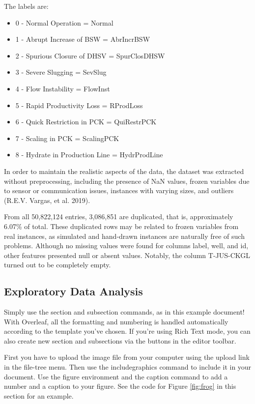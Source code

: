 \documentclass{article}
\begin{document}
The labels are:

\begin{itemize}
\item 0 - Normal Operation = Normal
\item 1 - Abrupt Increase of BSW = AbrIncrBSW
\item 2 - Spurious Closure of DHSV = SpurClosDHSW
\item 3 - Severe Slugging = SevSlug
\item 4 - Flow Instability = FlowInst
\item 5 - Rapid Productivity Loss = RProdLoss
\item 6 - Quick Restriction in PCK = QuiRestrPCK
\item 7 - Scaling in PCK = ScalingPCK
\item 8 - Hydrate in Production Line = HydrProdLine
\end{itemize}

In order to maintain the realistic aspects of the data, the dataset was extracted without preprocessing, including the presence of NaN values, frozen variables due to sensor or communication issues, instances with varying sizes, and outliers (R.E.V. Vargas, et al. 2019).

From all 50,822,124 entries, 3,086,851 are duplicated, that is, approximately 6.07\% of total. These duplicated rows may be related to frozen variables from real instances, as simulated and hand-drawn instances are naturally free of such problems. Although no missing values were found for columns label, well, and id, other features presented null or absent values. Notably, the column T-JUS-CKGL turned out to be completely empty.

\subsection{Exploratory Data Analysis}

Simply use the section and subsection commands, as in this example document! With Overleaf, all the formatting and numbering is handled automatically according to the template you've chosen. If you're using Rich Text mode, you can also create new section and subsections via the buttons in the editor toolbar.

First you have to upload the image file from your computer using the upload link in the file-tree menu. Then use the includegraphics command to include it in your document. Use the figure environment and the caption command to add a number and a caption to your figure. See the code for Figure \ref{fig:frog} in this section for an example.
\end{document}
